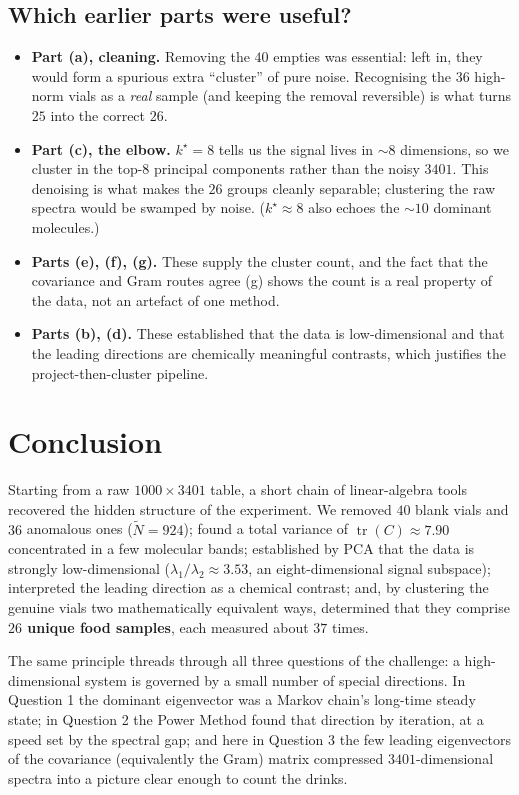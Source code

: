 \documentclass[11pt]{article}
\DeclareMathOperator{\tr}{tr}
\newcommand{\Nt}{\widetilde{N}}
\theoremstyle{definition}\newtheorem{definition}{Definition}[section]
\theoremstyle{plain}\newtheorem{proposition}{Proposition}[section]
\theoremstyle{remark}\newtheorem{remark}{Remark}[section]
\begin{document}
\subsection{Which earlier parts were useful?}
\begin{itemize}
\item \textbf{Part (a), cleaning.} Removing the $40$ empties was essential: left in, they would
form a spurious extra ``cluster'' of pure noise. Recognising the $36$ high-norm vials as a
\emph{real} sample (and keeping the removal reversible) is what turns $25$ into the correct
$26$.
\item \textbf{Part (c), the elbow.} $k^\star=8$ tells us the signal lives in $\sim8$ dimensions,
so we cluster in the top-$8$ principal components rather than the noisy $3401$. This denoising
is what makes the $26$ groups cleanly separable; clustering the raw spectra would be swamped by
noise. ($k^\star\approx8$ also echoes the $\sim10$ dominant molecules.)
\item \textbf{Parts (e), (f), (g).} These supply the cluster count, and the fact that the
covariance and Gram routes agree (g) shows the count is a real property of the data, not an
artefact of one method.
\item \textbf{Parts (b), (d).} These established that the data is low-dimensional and that the
leading directions are chemically meaningful contrasts, which justifies the
project-then-cluster pipeline.
\end{itemize}

\section{Conclusion}\label{sec:conclusion}
Starting from a raw $1000\times3401$ table, a short chain of linear-algebra tools recovered the
hidden structure of the experiment. We removed $40$ blank vials and $36$ anomalous ones
($\Nt=924$); found a total variance of $\tr(C)\approx7.90$ concentrated in a few molecular
bands; established by PCA that the data is strongly low-dimensional
($\lambda_1/\lambda_2\approx3.53$, an eight-dimensional signal subspace); interpreted the
leading direction as a chemical contrast; and, by clustering the genuine vials two
mathematically equivalent ways, determined that they comprise \textbf{$26$ unique food
samples}, each measured about $37$ times.

The same principle threads through all three questions of the challenge: a high-dimensional
system is governed by a small number of special directions. In Question 1 the dominant
eigenvector was a Markov chain's long-time steady state; in Question 2 the Power Method found
that direction by iteration, at a speed set by the spectral gap; and here in Question 3 the few
leading eigenvectors of the covariance (equivalently the Gram) matrix compressed $3401$-dimensional
spectra into a picture clear enough to count the drinks.
\end{document}

